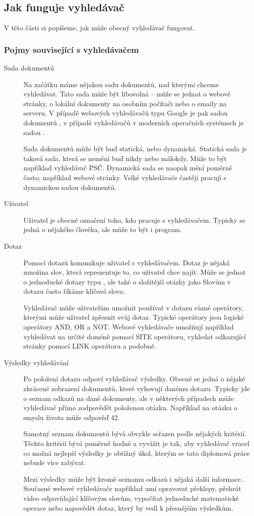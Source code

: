 \documentclass[12pt]{article}
\begin{document}
\subsection{Jak funguje vyhledávač}
V této části si popíšeme, jak může obecný vyhledávač fungovat. 

\subsubsection{Pojmy související s vyhledávačem}
\begin{description}
\item[Sada dokumentů] Na začátku máme nějakou sadu dokumentů, nad kterými chceme vyhledávat. Tato sada může být libovolná -- může se jednat o webové stránky, o lokální dokumenty na osobním počítači nebo o emaily na serveru. V případě webových vyhledávačů typu Google je pak sadou dokumentů , v případě vyhledávačů v moderních operačních systémech je sadou . 

Sada dokumentů může být buď statická, nebo dynamická. Statická sada je taková sada, která se nemění buď nikdy nebo málokdy. Může to být například vyhledávač PSČ. Dynamická sada se naopak mění poměrně často, například webové stránky. Velké vyhledávače častěji pracují s dynamickou sadou dokumentů. 
\item[Uživatel] Uživatel je obecné označení toho, kdo pracuje s vyhledávačem. Typicky se jedná o nějakého člověka, ale může to být i program. 
\item[Dotaz] Pomocí dotazů komunikuje uživatel s vyhledávačem. Dotaz je nějaká množina slov, která reprezentuje to, co uživatel chce najít. Může se jednat o jednoduché dotazy typu , ale také o složitější otázky jako  Slovům v dotazu často říkáme klíčová slova. 

Vyhledávač může uživatelům umožnit používat v dotazu různé operátory, kterými může uživatel zpřesnit svůj dotaz. Typické operátory jsou logické operátory AND, OR a NOT. Webové vyhledávače umožňují například vyhledávat na určité doméně pomocí SITE operátoru, vyhledat odkazující stránky pomocí LINK operátoru a podobně. 
\item[Výsledky vyhledávání] Po položení dotazu odpoví vyhledávač výsledky. Obecně se  jedná o nějaké zkrácené zobrazení dokumentů, které vyhovují danému dotazu. Typicky jde o seznam odkazů na dané dokumenty, ale v některých případech může vyhledávač přímo zodpovědět položenou otázku. Například na otázku o smyslu života může odpověď 42. 

Samotný seznam dokumentů bývá obvykle seřazen podle nějakých kritérií. Těchto kritérií bývá poměrně hodně a vyvážit je tak, aby vyhledávač vracel co možná nejlepší výsledky je obtížný úkol, kterým se tato diplomová práce nebude více zabývat. 

Mezi výsledky může být kromě seznamu odkazů i nějaká další informace. Současné webové vyhledávače například umí opravovat překlepy, přehrát video odpovídající klíčovým slovům, vypočítat jednoduché matematické operace nebo napovědět dotaz, který by vedl k přesnějším výsledkům. 
\end{description}
\end{document}
